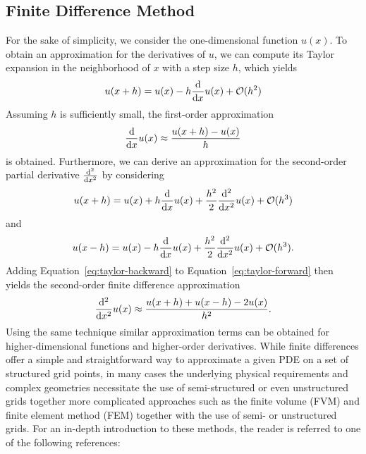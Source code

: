 \subsection{Finite Difference Method}
For the sake of simplicity, we consider the one-dimensional function $u(x)$.
To obtain an approximation for the derivatives of $u$, we can compute its Taylor expansion in the neighborhood of $x$ with a step size $h$, which yields
\begin{equation}
	u(x + h) = u(x) - h \dv{x} u(x) + \mathcal{O}(h^2)
\end{equation}
Assuming $h$ is sufficiently small, the first-order approximation 
\begin{equation}
	\dv{x} u(x) \approx \frac{u(x + h) -  u(x)}{h}
\end{equation}
is obtained.
Furthermore, we can derive an approximation for the second-order partial derivative $\dv[2]{x}$ by considering
\begin{equation}
	u(x + h) = u(x) + h \dv{x} u(x) + \frac{h^2}{2} \dv[2]{x} u(x) + \mathcal{O}(h^3)
	\label{eq:taylor-forward}
\end{equation}
and 
\begin{equation}
	u(x - h) = u(x) - h \dv{x} u(x) + \frac{h^2}{2} \dv[2]{x} u(x) + \mathcal{O}(h^3).
	\label{eq:taylor-backward}
\end{equation}
Adding Equation~\eqref{eq:taylor-backward} to Equation~\eqref{eq:taylor-forward} then yields the second-order finite difference approximation
\begin{equation}
	 \dv[2]{x} u(x) \approx \frac{u(x + h) + u(x - h) - 2u(x)}{h^2}.
\end{equation}
Using the same technique similar approximation terms can be obtained for higher-dimensional functions and higher-order derivatives. %
While finite differences offer a simple and straightforward way to approximate a given PDE on a set of structured grid points, in many cases the underlying physical requirements and complex geometries necessitate the use of semi-structured or even unstructured grids together more complicated approaches such as the finite volume (FVM) and finite element method (FEM) together with the use of semi- or unstructured grids.
For an in-depth introduction to these methods, the reader is referred to one of the following references:
